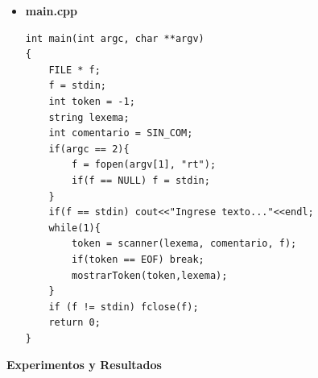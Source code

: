 \documentclass[a4paper,12pt]{article}
\begin{document}
\begin{itemize}
\begin{lstlisting}
void mostrarToken(int token, string lexema){
    if(token < 0) return;
    switch(token){
        case WHILE:
            cout<<"WHILE->"; break;
        case IF:
            cout<<"IF->"; break;
        case ID:
            cout<<"ID->"; break;
        case NUM:
            cout<<"NUM->"; break;
        case PUNTO_Y_COMA:
            cout<<"PUNTO Y COMA->"; break;
        case MAS:
            cout<<"MAS->"; break;
        case MAYOR:
            cout<<"MAYOR->"; break;
        case MAYOR_IGUAL:
            cout<<"MAYOR_IGUAL->"; break;
        case MENOS:
            cout<<"MENOS->"; break;
        case MULT:
            cout<<"MULT->"; break;
        case DIV:
            cout<<"DIV->"; break;
        case MENOR:
            cout<<"MENOR->"; break;
        case MENOR_IGUAL:
            cout<<"MENOR_IGUAL->"; break;
        case ASIG:
            cout<<"ASIG->"; break;
        case IGUAL:
            cout<<"IGUAL->"; break;
        case NEGACION:
            cout<<"NEGACION->"; break;
        case DIFERENTE:
            cout<<"DIFERENTE->"; break;
        case LLAVE_IZQ:
            cout<<"LLAVE_IZQ->"; break;
        case LLAVE_DER:
            cout<<"LLAVE_DER->"; break;
        case COR_IZQ:
            cout<<"COR_IZQ->"; break;
        case COR_DER:
            cout<<"COR_DER->"; break;
        case COMILLAS:
            cout<<"COMILLAS->"; break;
        case PAR_IZQ:
            cout<<"PAR_IZQ->"; break;
        case PAR_DER:
            cout<<"PAR_DER->"; break;



    }
    cout<<lexema<<endl;

}

#endif
\end{lstlisting}
\item \textbf{main.cpp}

\begin{lstlisting}
int main(int argc, char **argv)
{
    FILE * f;
    f = stdin;
    int token = -1;
    string lexema;
    int comentario = SIN_COM;
    if(argc == 2){
        f = fopen(argv[1], "rt");
        if(f == NULL) f = stdin;
    }
    if(f == stdin) cout<<"Ingrese texto..."<<endl;
    while(1){
        token = scanner(lexema, comentario, f);
        if(token == EOF) break;
        mostrarToken(token,lexema);
    }
    if (f != stdin) fclose(f);
    return 0;
}
\end{lstlisting}
\end{itemize}

\begin{large}
 \textbf{Experimentos y Resultados}
\end{large}
\end{document}

